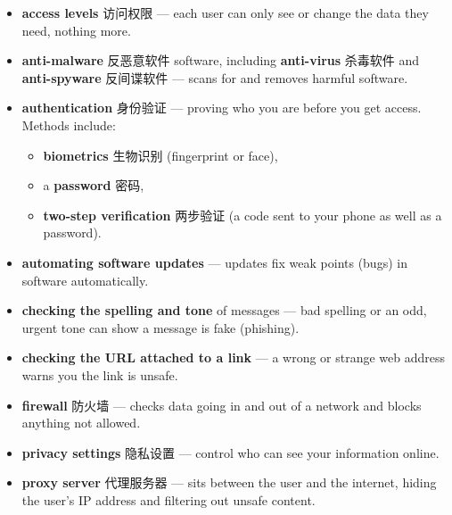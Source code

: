 \documentclass[11pt]{article}
\begin{document}
\begin{itemize}
\item \textbf{access levels} 访问权限 — each user can only see or change the data they need, nothing more.

\item \textbf{anti-malware} 反恶意软件 software, including \textbf{anti-virus} 杀毒软件 and \textbf{anti-spyware} 反间谍软件 — scans for and removes harmful software.

\item \textbf{authentication} 身份验证 — proving who you are before you get access. Methods include:

\begin{itemize}
\item \textbf{biometrics} 生物识别 (fingerprint or face),

\item a \textbf{password} 密码,

\item \textbf{two-step verification} 两步验证 (a code sent to your phone as well as a password).

\end{itemize}

\item \textbf{automating software updates} — updates fix weak points (bugs) in software automatically.

\item \textbf{checking the spelling and tone} of messages — bad spelling or an odd, urgent tone can show a message is fake (phishing).

\item \textbf{checking the URL attached to a link} — a wrong or strange web address warns you the link is unsafe.

\item \textbf{firewall} 防火墙 — checks data going in and out of a network and blocks anything not allowed.

\item \textbf{privacy settings} 隐私设置 — control who can see your information online.

\item \textbf{proxy server} 代理服务器 — sits between the user and the internet, hiding the user's IP address and filtering out unsafe content.

\end{itemize}
\end{document}
